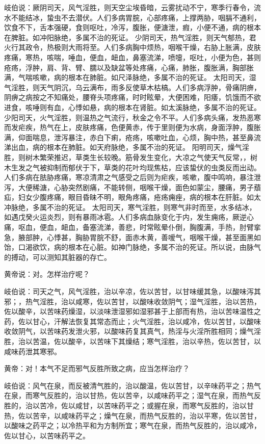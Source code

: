 \documentclass[a4paper,12pt,UTF8,twoside]{ctexbook}
\begin{document}
岐伯说：厥阴司天，风气淫胜，则天空尘埃昏暗，云雾扰动不宁，寒季行春令，流水不能结冰，蛰虫不去潜伏。人们多病胃脘，心部疼痛，上撑两胁，咽膈不通利，饮食不下，舌本强硬，食则呕吐，冷泻，腹胀，便溏泄，瘕，小便不通，病的根本在脾脏。如冲阳脉绝，多属不治的死证。
少阴司天，热气淫胜，则天气郁热，君火行其政令，热极则大雨将至。人们多病胸中烦热，咽喉干燥，右胁上胀满，皮肤疼痛，寒热，咳喘，唾血，便血，衄血，鼻塞流涕，喷嚏，呕吐，小便为色，甚则疮疡，浮肿，肩、背、臂、臑以及缺盆等处疼痛，心痛，肺胀，腹胀满，胸部胀满，气喘咳嗽，病的根本在肺脏。如尺泽脉绝，多属不治的死证。
太阳司天，湿气淫胜，则天气阴沉，乌云满布，雨多反使草木枯槁。人们多病浮肿，骨痛阴痹，阴痹之病按之不知痛处，腰脊头项疼痛，时时眩晕，大便困难，阳痿，饥饿而不欲进食，咳唾则有血，心悸如悬，病的根本在肾脏。如太溪脉绝，多属不治的死证。
少阳司天，火气淫胜，则温热之气流行，秋金之令不平。人们多病头痛，发热恶寒而发疟疾，热气在上，皮肤疼痛，色便黄赤，传于里则便为水病，身面浮肿，腹胀满，仰面喘息，泄泻暴注，赤白下痢，疮疡，咳嗽吐血，心烦，胸中热，甚至鼻流涕出血，病的根本在肺脏。如天府脉绝，多属不治的死证。
阳明司天，燥气淫胜，则树木繁荣推迟，草类生长较晚。筋骨发生变化，大凉之气使天气反常，，树木生发之气被抑制而郁伏于下，草类的花叶均现焦枯，应该蛰伏的虫类反而出动。人们多病在胠胁疼痛，寒凉清肃之气感受之后则为疟疾，咳嗽，腹中鸣响，暴注泄泻，大便稀溏，心胁突然剧痛，不能转侧，咽喉干燥，面色如蒙尘，腰痛，男子蘈疝，妇女少腹疼痛，眼目昏昧不明，眼角疼痛，疮疡痈痤，病的根本在肝脏。如太冲脉绝，多属不治的死证。
太阳司天，寒气淫胜，则寒气非时而至，水多结冰，如遇戊癸火运炎烈，则有暴雨冰雹。人们多病血脉变化于内，发生痈疡，厥逆心痛，呕血，便血，衄血，备塞流涕，善悲，时常眩晕仆倒，胸腹满，手热，肘臂挛急，腋部肿，心悸甚，胸胁胃脘不舒，面赤木黄，善嗳气，咽喉干燥，甚至面黑如饴，口渴欲饮，病的根本在心脏。如神门脉绝，多属不治的死证。所以说，由脉气的搏动，可以测知其脏器的存亡。

黄帝说：对。怎样治疗呢？

岐伯说：司天之气，风气淫胜，治以辛凉，佐以苦甘，以甘味缓其急，以酸味泻其邪；，热气淫胜，治以咸寒，佐以苦甘，以酸味收敛阴气；湿气淫胜，治以苦热，佐以酸辛，以苦味药燥湿，以淡味泄湿邪如湿邪甚于上部而有热，治以苦味温性之药，佐以甘心，汗解法恢复其常态而止；火气淫胜，治以咸冷，佐以苦甘，以酸味收敛阴气，以苦味药发泄火邪，以酸味药复其真气，热淫与火淫所胜相同；燥气淫胜，治以苦温，佐以酸辛，以苦味下其燥结；寒气淫胜，治以辛热，佐以苦甘，以咸味药泄其寒邪。

黄帝：对！本气不足而邪气反胜所致之病，应当怎样治疗？

岐伯说：风气在泉，而反被清气胜的，治以酸温，佐以苦甘，以辛味药平之；热气在泉，而寒气反胜的，治以甘热，佐以苦辛，以咸味药平之；湿气在泉，而热气反胜的，治以苦冷，佐以咸甘，以苦味药平之；或握在泉，而寒气反胜的，治以甘热，佐以苦辛，以咸味药平之；燥气在泉，而热气反胜的，治以平寒，佐以苦甘，以酸味之药平之；以冷热平和为方制所宜；寒气在泉，而热气反胜的，治以咸冷，佐以甘心，以苦味药平之。
\end{document}
